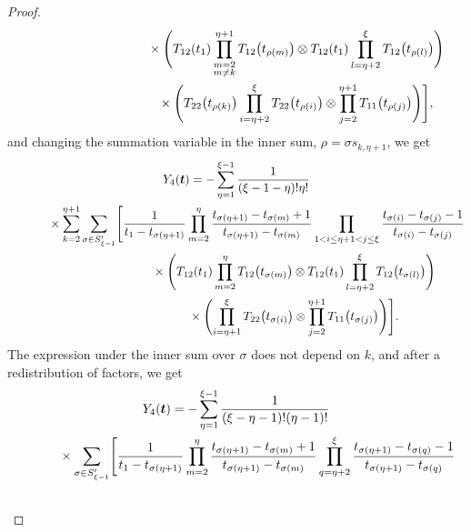 \documentclass[pdftex]{sigma}
\numberwithin{equation}{section}
\begin{document}
\begin{proof}
\begin{gather*}
\hphantom{Y_4(\boldsymbol{t})= \times\sum_{k=2}^{\eta+1} \sum_{\rho\in S_{\xi-1}'} \Biggl[}{}
\times\Biggl(T_{12}(t_1) \prod_{\substack{m=2\\m\neq k}}^{\eta+1} T_{12} \bigl(t_{\rho(m)}\bigr) \otimes T_{12}(t_1) \prod_{l=\eta+2}^{\xi } T_{12} \bigl(t_{\rho(l)}\bigr) \Biggr) \\
\hphantom{Y_4(\boldsymbol{t})= \times\sum_{k=2}^{\eta+1} \sum_{\rho\in S_{\xi-1}'} \Biggl[}{}
\times\Biggl( T_{22}\bigl(t_{\rho(k)}\bigr)\prod_{i=\eta+2}^{\xi } T _{22}\bigl(t_{\rho(i)}\bigr)\otimes \prod_{j=2}^{\eta+1} T _{11}\bigl(t_{\rho(j)}\bigr)\Biggr) \Biggr],
\end{gather*}
and changing the summation variable in the inner sum, $\rho=\sigma s_{k,\eta+1}$, we get
\begin{gather*}
 Y_4(\boldsymbol{t})= -\sum_{\eta=1}^{\xi-1} \frac{1}{(\xi-1-\eta) ! \eta!}\\
 \hphantom{Y_4(\boldsymbol{t})=}{}
 \times\sum_{k=2}^{\eta+1}\sum_{\sigma\in S_{\xi-1}'} \Biggl[ \frac{1}{t_1-t_{\sigma(\eta+1)}} \prod_{m=2}^{\eta} \frac{t_{\sigma(\eta+1)}-t_{\sigma(m)}+1}{t_{\sigma(\eta+1)}-t_{\sigma(m)}}\prod_{1< i\leq\eta+1<j \leq \xi} \frac{t_{\sigma(i)}-t_{\sigma(j)}-1}{t_{\sigma(i)}-t_{\sigma(j)}} \\
 \hphantom{Y_4(\boldsymbol{t})=\times\sum_{k=2}^{\eta+1}\sum_{\sigma\in S_{\xi-1}'} \Biggl[}{}
\times\Biggl(T_{12}(t_1) \prod_{m=2}^{\eta} T_{12} \bigl(t_{\sigma(m)}\bigr) \otimes T_{12}(t_1) \prod_{l=\eta+2}^{\xi } T_{12} \bigl(t_{\sigma(l)}\bigr) \Biggr)\\
 \hphantom{Y_4(\boldsymbol{t})=\times\sum_{k=2}^{\eta+1}\sum_{\sigma\in S_{\xi-1}'} \Biggl[}{}
\times \Biggl( \prod_{i=\eta+1}^{\xi } T _{22}\bigl(t_{\sigma(i)}\bigr)\otimes \prod_{j=2}^{\eta+1} T _{11}\bigl(t_{\sigma(j)}\bigr)\Biggr) \Biggr].
\end{gather*}
The expression under the inner sum over $\sigma$ does not depend on $k$, and after a redistribution of factors, we get
\begin{gather}
 Y_4(\boldsymbol{t})= -\sum_{\eta=1}^{\xi-1} \frac{1}{(\xi-\eta-1)!(\eta-1)!}\nonumber\\
 \hphantom{Y_4(\boldsymbol{t})=}{}
 \times\sum_{\sigma\in S_{\xi-1}'} \Biggl[ \frac{1}{t_1-t_{\sigma(\eta+1)}}\prod_{m=2}^{\eta} \frac{t_{\sigma(\eta+1)}-t_{\sigma(m)}+1}{t_{\sigma(\eta+1)}-t_{\sigma(m)}}\prod_{q=\eta+2}^\xi\frac{t_{\sigma(\eta+1)}-t_{\sigma(q)}-1}{t_{\sigma(\eta+1)}-t_{\sigma(q)}}\nonumber\\
 \hphantom{Y_4(\boldsymbol{t})=\times\sum_{\sigma\in S_{\xi-1}'} \Biggl[}{}

\end{gather}
\end{proof}
\end{document}
